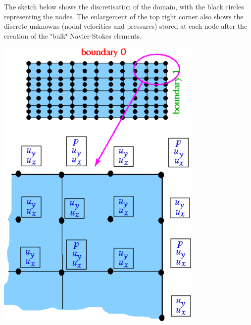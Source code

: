 The sketch below shows the discretisation of the domain, with the black circles representing the nodes. The enlargement of the top right corner also shows the discrete unknowns (nodal velocities and pressures) stored at each node after the creation of the \char`\"{}bulk\char`\"{} Navier-\/\+Stokes elements.

 
\begin{DoxyImage}
\includegraphics[width=0.75\textwidth]{multiple_face_elements1}
\end{DoxyImage}



